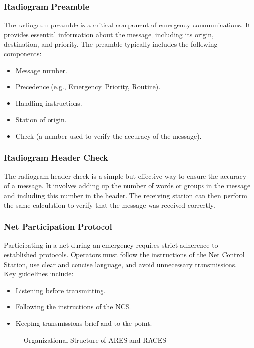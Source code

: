 \subsubsection*{Radiogram Preamble}
The radiogram preamble is a critical component of emergency communications. It provides essential information about the message, including its origin, destination, and priority. The preamble typically includes the following components:
\begin{itemize}
    \item Message number.
    \item Precedence (e.g., Emergency, Priority, Routine).
    \item Handling instructions.
    \item Station of origin.
    \item Check (a number used to verify the accuracy of the message).
\end{itemize}

\subsubsection*{Radiogram Header Check}
The radiogram header check is a simple but effective way to ensure the accuracy of a message. It involves adding up the number of words or groups in the message and including this number in the header. The receiving station can then perform the same calculation to verify that the message was received correctly.

\subsubsection*{Net Participation Protocol}
Participating in a net during an emergency requires strict adherence to established protocols. Operators must follow the instructions of the Net Control Station, use clear and concise language, and avoid unnecessary transmissions. Key guidelines include:
\begin{itemize}
    \item Listening before transmitting.
    \item Following the instructions of the NCS.
    \item Keeping transmissions brief and to the point.
\end{itemize}

\begin{figure}[h!]
    \centering
    \caption{Organizational Structure of ARES and RACES}
    \label{fig:ares-races-structure}
\end{figure}

